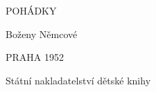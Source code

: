 \documentclass[a5paper]{article}
\begin{document}
\begin{centering}
\fontsize{50}{50}\selectfont
POHÁDKY\\
\bigskip

\fontsize{33}{33}\selectfont
Boženy Němcové

\vfill
\fontsize{16}{16}\selectfont
PRAHA 1952\\
\bigskip

Státní nakladatelství dětské knihy

\end{centering}
\end{document}
